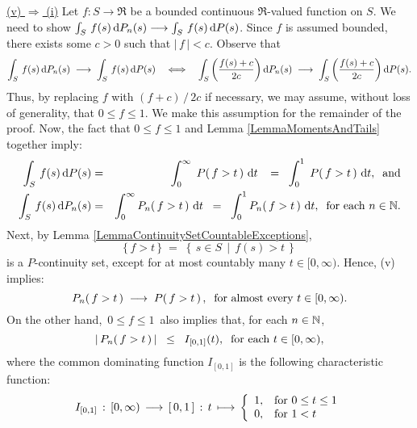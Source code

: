 \vskip 0.8cm
\noindent
\underline{(v) $\Longrightarrow$ (i)}
\vskip 0.2cm
\noindent
Let $f : S \longrightarrow \Re$ be a bounded continuous $\Re$-valued function on $S$.
We need to show $\int_{S}\,f(s)\,\textnormal{d} P_{n}(s) \longrightarrow \int_{S}\,f(s)\,\textnormal{d} P(s)$.
Since $f$ is assumed bounded, there exists some $c > 0$ such that $\vert\,f\,\vert < c$.
Observe that
\begin{equation*}
\int_{S}\,f(s)\,\textnormal{d} P_{n}(s) \;\longrightarrow\; \int_{S}\,f(s)\,\textnormal{d} P(s)
\quad\Longleftrightarrow\quad
\int_{S}\left(\dfrac{f(s)+c}{2 c}\right)\textnormal{d} P_{n}(s) \;\longrightarrow\; \int_{S}\left(\dfrac{f(s)+c}{2 c}\right)\textnormal{d} P(s).
\end{equation*}
Thus, by replacing $f$ with $(f + c)\,/\,2c$ if necessary, we may assume, without loss of generality, that $0 \leq f \leq 1$.
We make this assumption for the remainder of the proof.
\vskip 0.2cm
\noindent
Now, the fact that $0 \leq f \leq 1$ and Lemma \ref{LemmaMomentsAndTails}
together imply:
\begin{eqnarray*}
\int_{S}\,f(s)\,\textnormal{d} P(s)
&=& \int_{0}^{\infty}\;P\!\left(\,f > t\,\right)\,\textnormal{d} t\;\mbox{}
\;\;=\;\; \int_{0}^{1}\;P\!\left(\,f > t\,\right)\,\textnormal{d} t,
\;\;\textnormal{and}
\\
\int_{S}\,f(s)\,\textnormal{d} P_{n}(s)
&=& \int_{0}^{\infty}P_{n}\!\left(\,f > t\,\right)\,\textnormal{d} t
\;\;=\;\; \int_{0}^{1}P_{n}\!\left(\,f > t\,\right)\,\textnormal{d} t,
\;\;\textnormal{for each $n \in \mathbb{N}$}.
\end{eqnarray*}
Next, by Lemma \ref{LemmaContinuitySetCountableExceptions},
\begin{equation*}
\{\,f > t\,\}
\;=\;\left\{\, s \in S \;\,\vert\;\, f(s) > t \,\right\}
\end{equation*}
is a $P$-continuity set, except for at most countably many $t \in [0,\infty)$.
Hence, (v) implies:
\begin{equation*}
P_{n}\!\left(\,f > t\,\right) \;\longrightarrow\; P\!\left(\,f > t\,\right),
\;\;\textnormal{for almost every $t \in [0,\infty)$}.
\end{equation*}
On the other hand, \,$0 \leq f \leq 1$\, also implies that, for each $n \in \mathbb{N}$,
\begin{equation*}
\left\vert\,P_{n}\!\left(\,f > t\,\right)\,\right\vert
\;\;\leq\;\; I_{[0,1]}(t),
\;\;\textnormal{for each $t \in [0,\infty)$},
\end{equation*}
where the common dominating function $I_{[0,1]}$ is the following characteristic function:
\begin{equation*}
I_{[0,1]} \,:\, [0,\infty) \,\longrightarrow\, [\,0,1\,] \,:\, t \,\longmapsto\,
\left\{\begin{array}{cl}
1, & \textnormal{for $0 \leq t \leq 1$}
\\
0, & \textnormal{for $1 < t$}
\end{array}\right.
\end{equation*}

